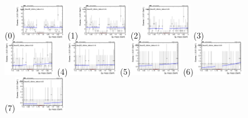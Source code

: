 \begin{figure}[h!]
        \centering
        \subfigure(0){\includegraphics[width=0.2\textwidth]{unfixed_exp/plots/tauhB/massfit_tauhB_40bins_bdtcut-0.4.png}}
        \subfigure(1){\includegraphics[width=0.2\textwidth]{unfixed_exp/plots/tauhB/massfit_tauhB_40bins_bdtcut-0.34.png}}
        \subfigure(2){\includegraphics[width=0.2\textwidth]{unfixed_exp/plots/tauhB/massfit_tauhB_40bins_bdtcut-0.28.png}}
        \subfigure(3){\includegraphics[width=0.2\textwidth]{unfixed_exp/plots/tauhB/massfit_tauhB_40bins_bdtcut-0.22.png}}
        \subfigure(4){\includegraphics[width=0.2\textwidth]{unfixed_exp/plots/tauhB/massfit_tauhB_40bins_bdtcut-0.16.png}}
        \subfigure(5){\includegraphics[width=0.2\textwidth]{unfixed_exp/plots/tauhB/massfit_tauhB_40bins_bdtcut-0.13.png}}
        \subfigure(6){\includegraphics[width=0.2\textwidth]{unfixed_exp/plots/tauhB/massfit_tauhB_40bins_bdtcut-0.09.png}}
        \subfigure(7){\includegraphics[width=0.2\textwidth]{unfixed_exp/plots/tauhB/massfit_tauhB_40bins_bdtcut-0.05.png}}

\end{figure}
